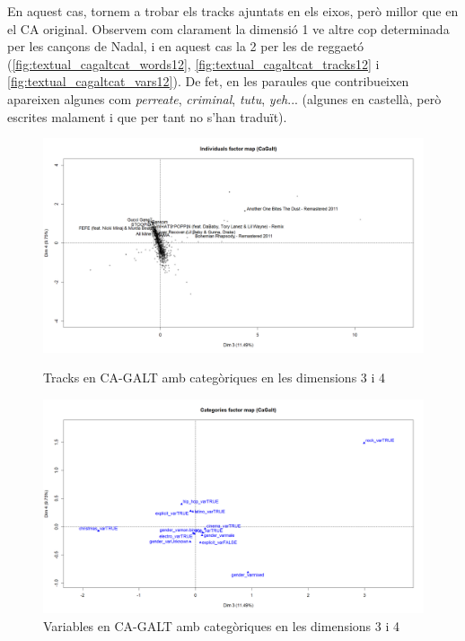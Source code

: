 En aquest cas, tornem a trobar els tracks ajuntats en els eixos, però millor que en el CA original. Observem com clarament la dimensió 1 ve altre cop determinada per les cançons de Nadal, i en aquest cas la 2 per les de reggaetó (\ref{fig:textual_cagaltcat_words12}, \ref{fig:textual_cagaltcat_tracks12} i \ref{fig:textual_cagaltcat_vars12}). De fet, en les paraules que contribueixen apareixen algunes com \textit{perreate}, \textit{criminal}, \textit{tutu}, \textit{yeh}... (algunes en castellà, però escrites malament i que per tant no s'han traduït).

\begin{figure}[H]
\centering
    \begin{minipage}{.4\textwidth}
        \centering
        \includegraphics[width=0.95\linewidth]{Images//8_Textual//Analysis/cagalt2_tracks_34.png}
        \caption{Tracks en CA-GALT amb categòriques en les dimensions 3 i 4}
        \label{fig:textual_cagaltcat_tracks34}
    \end{minipage}%
    \begin{minipage}{.4\textwidth}
        \centering
        \includegraphics[width=0.95\linewidth]{Images//8_Textual//Analysis/cagalt2_quali_34.png}
        \caption{Variables en CA-GALT amb categòriques en les dimensions 3 i 4}
        \label{fig:textual_cagaltcat_vars34}
    \end{minipage}%
\end{figure}

